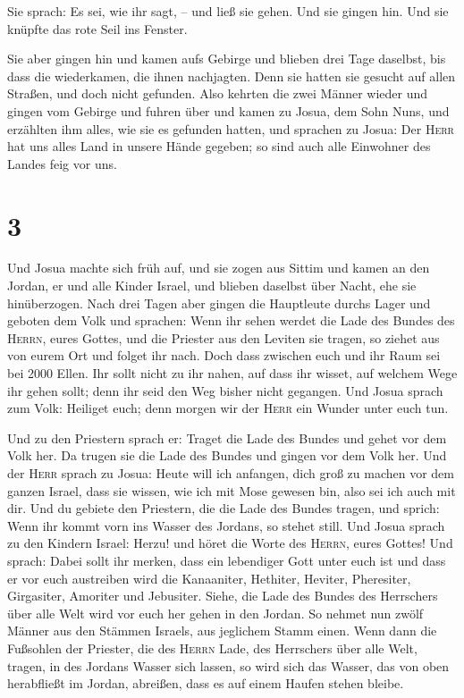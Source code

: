  Sie sprach: Es sei, wie ihr sagt, -- und ließ sie gehen.
Und sie gingen hin. Und sie knüpfte das rote Seil ins Fenster.

 Sie aber gingen hin und kamen aufs Gebirge und blieben
drei Tage daselbst, bis dass die wiederkamen, die ihnen nachjagten. Denn
sie hatten sie gesucht auf allen Straßen, und doch nicht gefunden.
 Also kehrten die zwei Männer wieder und gingen vom
Gebirge und fuhren über und kamen zu Josua, dem Sohn Nuns, und erzählten
ihm alles, wie sie es gefunden hatten,  und sprachen zu
Josua: Der \textsc{Herr} hat uns alles Land in unsere Hände gegeben; so
sind auch alle Einwohner des Landes feig vor uns.

\hypertarget{section-2}{%
\section{3}\label{section-2}}

 Und Josua machte sich früh auf, und sie zogen aus Sittim
und kamen an den Jordan, er und alle Kinder Israel, und blieben daselbst
über Nacht, ehe sie hinüberzogen.  Nach drei Tagen aber
gingen die Hauptleute durchs Lager  und geboten dem Volk
und sprachen: Wenn ihr sehen werdet die Lade des Bundes des
\textsc{Herrn}, eures Gottes, und die Priester aus den Leviten sie
tragen, so ziehet aus von eurem Ort und folget ihr nach. 
Doch dass zwischen euch und ihr Raum sei bei 2000 Ellen. Ihr sollt nicht
zu ihr nahen, auf dass ihr wisset, auf welchem Wege ihr gehen sollt;
denn ihr seid den Weg bisher nicht gegangen.  Und Josua
sprach zum Volk: Heiliget euch; denn morgen wir der \textsc{Herr} ein
Wunder unter euch tun.

 Und zu den Priestern sprach er: Traget die Lade des
Bundes und gehet vor dem Volk her. Da trugen sie die Lade des Bundes und
gingen vor dem Volk her.  Und der \textsc{Herr} sprach zu
Josua: Heute will ich anfangen, dich groß zu machen vor dem ganzen
Israel, dass sie wissen, wie ich mit Mose gewesen bin, also sei ich auch
mit dir.  Und du gebiete den Priestern, die die Lade des
Bundes tragen, und sprich: Wenn ihr kommt vorn ins Wasser des Jordans,
so stehet still.  Und Josua sprach zu den Kindern Israel:
Herzu! und höret die Worte des \textsc{Herrn}, eures Gottes!
 Und sprach: Dabei sollt ihr merken, dass ein lebendiger
Gott unter euch ist und dass er vor euch austreiben wird die Kanaaniter,
Hethiter, Heviter, Pheresiter, Girgasiter, Amoriter und Jebusiter.
 Siehe, die Lade des Bundes des Herrschers über alle Welt
wird vor euch her gehen in den Jordan.  So nehmet nun
zwölf Männer aus den Stämmen Israels, aus jeglichem Stamm einen.
 Wenn dann die Fußsohlen der Priester, die des
\textsc{Herrn} Lade, des Herrschers über alle Welt, tragen, in des
Jordans Wasser sich lassen, so wird sich das Wasser, das von oben
herabfließt im Jordan, abreißen, dass es auf einem Haufen stehen bleibe.

